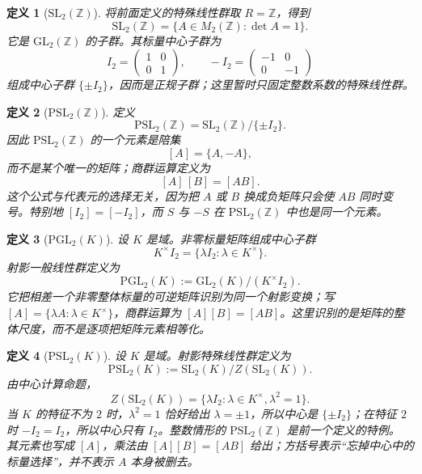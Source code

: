 \documentclass[UTF8,fontset=none,a4paper,11pt]{ctexart}
\theoremstyle{foundation-definition}
\newtheorem{definition}{定义}[section]
\theoremstyle{foundation-theorem}
\theoremstyle{foundation-proposition}
\theoremstyle{foundation-example}
\theoremstyle{foundation-remark}
\theoremstyle{foundation-theorem}
\begin{document}
\begin{definition}[\(\mathrm{SL}_2(\mathbb Z)\)]\label{def:sl2-integer}
将前面定义的特殊线性群取 \(R=\mathbb Z\)，得到
\[
\mathrm{SL}_2(\mathbb Z)
=\{A\in M_2(\mathbb Z):\det A=1\}.
\]
它是 \(\mathrm{GL}_2(\mathbb Z)\) 的子群。其标量中心子群为
\[
I_2=\begin{pmatrix}1&0\\0&1\end{pmatrix},
\qquad
-I_2=\begin{pmatrix}-1&0\\0&-1\end{pmatrix}
\]
组成中心子群 \(\{\pm I_2\}\)，因而是正规子群；这里暂时只固定整数系数的特殊线性群。
\end{definition}

\begin{definition}[\(\mathrm{PSL}_2(\mathbb Z)\)]\label{def:psl}
定义
\[
\mathrm{PSL}_2(\mathbb Z)
=\mathrm{SL}_2(\mathbb Z)/\{\pm I_2\}.
\]
因此 \(\mathrm{PSL}_2(\mathbb Z)\) 的一个元素是陪集
\[
[A]=\{A,-A\},
\]
而不是某个唯一的矩阵；商群运算定义为
\[
[A]\,[B]=[AB].
\]
这个公式与代表元的选择无关，因为把 \(A\) 或 \(B\) 换成负矩阵只会使
\(AB\) 同时变号。特别地 \([I_2]=[-I_2]\)，而 \(S\) 与 \(-S\) 在
\(\mathrm{PSL}_2(\mathbb Z)\) 中也是同一个元素。
\end{definition}

\begin{definition}[\(\mathrm{PGL}_2(K)\)]\label{def:projective-linear-group}
设 \(K\) 是域。非零标量矩阵组成中心子群
\[
K^\times I_2=\{\lambda I_2:\lambda\in K^\times\}.
\]
射影一般线性群定义为
\[
\mathrm{PGL}_2(K):=\mathrm{GL}_2(K)/(K^\times I_2).
\]
它把相差一个非零整体标量的可逆矩阵识别为同一个射影变换；写
\([A]=\{\lambda A:\lambda\in K^\times\}\)，商群运算为
\([A][B]=[AB]\)。这里识别的是矩阵的整体尺度，而不是逐项把矩阵元素相等化。
\end{definition}

\begin{definition}[\(\mathrm{PSL}_2(K)\)]\label{def:projective-special-linear-group}
设 \(K\) 是域。射影特殊线性群定义为
\[
\mathrm{PSL}_2(K):=\mathrm{SL}_2(K)/Z(\mathrm{SL}_2(K)).
\]
由中心计算命题，
\[
Z(\mathrm{SL}_2(K))
=\{\lambda I_2:\lambda\in K^\times,\lambda^2=1\}.
\]
当 \(K\) 的特征不为 \(2\) 时，\(\lambda^2=1\) 恰好给出
\(\lambda=\pm1\)，所以中心是 \(\{\pm I_2\}\)；在特征 \(2\) 时
\(-I_2=I_2\)，所以中心只有 \(I_2\)。整数情形的 \(\mathrm{PSL}_2(\mathbb Z)\) 是前一个定义的特例。
其元素也写成 \([A]\)，乘法由 \([A][B]=[AB]\) 给出；方括号表示“忘掉中心中的
标量选择”，并不表示 \(A\) 本身被删去。
\end{definition}
\end{document}
